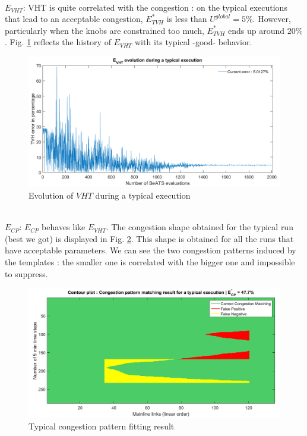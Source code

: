 \\
\emph{$E_{VHT}$}: VHT is quite correlated with the congestion : on the typical executions that lead to an acceptable congestion, $E_{TVH}^{*}$ is less than $U^{global}=5\%$. However, particularly when the knobs are constrained too much,  $E_{TVH}^{*}$ ends up around $20\%$.
Fig. \ref{fig:vhtexample} reflects the history of $E_{VHT}$ with its typical -good- behavior.\\
\begin{figure}[h]
	\label{fig:vhtexample}
	\caption{Evolution of $VHT$ during a typical execution}
	\includegraphics[width=7in]{figures/results_figures/VHTexample.png}
\end{figure}
\\
\emph{$E_{CP}$}: $E_{CP}$ behaves like $E_{VHT}$. The congestion shape obtained for the typical run (best we got) is displayed in Fig. \ref{fig:typicalcpexample}. This shape is obtained for all the runs that have acceptable parameters. We can see the two congestion patterns induced by the templates : the smaller one is correlated with the bigger one and impossible to suppress.\\
\begin{figure}[h]
	\label{fig:typicalcpexample}
	\caption{Typical congestion pattern fitting result}
	\includegraphics[width=7in]{figures/results_figures/typicalcpexample.png}
\end{figure}	
